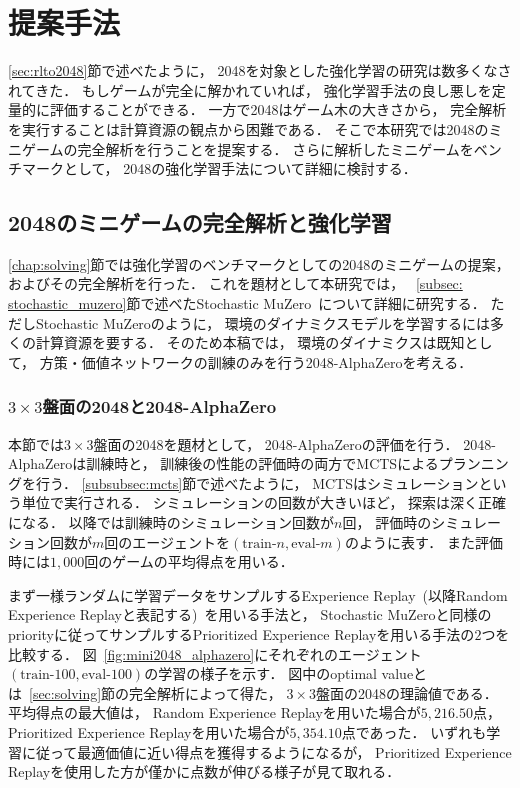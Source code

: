 \chapter{提案手法}
\label{chap:proposal}
\ref{sec:rlto2048}節で述べたように， 2048を対象とした強化学習の研究は数多くなされてきた．
もしゲームが完全に解かれていれば， 強化学習手法の良し悪しを定量的に評価することができる．
一方で2048はゲーム木の大きさから， 完全解析を実行することは計算資源の観点から困難である．
そこで本研究では2048のミニゲームの完全解析を行うことを提案する．
さらに解析したミニゲームをベンチマークとして， 2048の強化学習手法について詳細に検討する．



\section{2048のミニゲームの完全解析と強化学習}
\ref{chap:solving}節では強化学習のベンチマークとしての2048のミニゲームの提案， およびその完全解析を行った．
これを題材として本研究では， ~\ref{subsec: stochastic_muzero}節で述べたStochastic MuZero~\cite{StochasticMuZero}について詳細に研究する．
ただしStochastic MuZeroのように， 環境のダイナミクスモデルを学習するには多くの計算資源を要する．
そのため本稿では， 環境のダイナミクスは既知として， 方策・価値ネットワークの訓練のみを行う2048-AlphaZeroを考える．

\subsection{$3\times3$盤面の2048と2048-AlphaZero}
本節では$3\times3$盤面の2048を題材として， 2048-AlphaZeroの評価を行う．
2048-AlphaZeroは訓練時と， 訓練後の性能の評価時の両方でMCTSによるプランニングを行う．
\ref{subsubsec:mcts}節で述べたように， MCTSはシミュレーションという単位で実行される．
シミュレーションの回数が大きいほど， 探索は深く正確になる．
以降では訓練時のシミュレーション回数が$n$回， 評価時のシミュレーション回数が$m$回のエージェントを$(\text{train-}n,\text{eval-}m)$のように表す．
また評価時には$1,000$回のゲームの平均得点を用いる．

まず一様ランダムに学習データをサンプルするExperience Replay~(以降Random Experience Replayと表記する)~を用いる手法と， Stochastic MuZeroと同様のpriorityに従ってサンプルするPrioritized Experience Replayを用いる手法の$2$つを比較する．
図~\ref{fig:mini2048_alphazero}にそれぞれのエージェント$(\text{train-}100,\text{eval-}100)$の学習の様子を示す．
図中のoptimal valueとは~\ref{sec:solving}節の完全解析によって得た， $3\times3$盤面の2048の理論値である．
平均得点の最大値は， Random Experience Replayを用いた場合が$5,216.50$点， Prioritized Experience Replayを用いた場合が$5,354.10$点であった．
いずれも学習に従って最適価値に近い得点を獲得するようになるが， Prioritized Experience Replayを使用した方が僅かに点数が伸びる様子が見て取れる．

